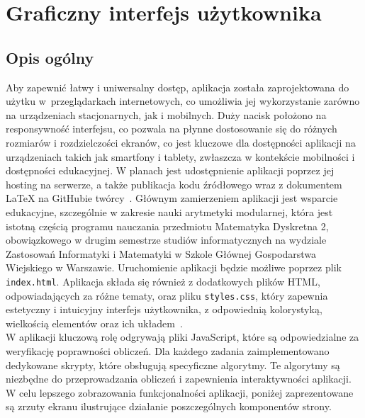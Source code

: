 \documentclass{SGGW-thesis}
\begin{document}
	\chapter{Graficzny interfejs użytkownika}
	\section{Opis ogólny}
	Aby zapewnić łatwy i uniwersalny dostęp, aplikacja została zaprojektowana do użytku w~przeglądarkach internetowych, co umożliwia jej wykorzystanie zarówno na urządzeniach stacjonarnych, jak i mobilnych. Duży nacisk położono na responsywność interfejsu, co pozwala na płynne dostosowanie się do różnych rozmiarów i rozdzielczości ekranów, co jest kluczowe dla dostępności aplikacji na urządzeniach takich jak smartfony i tablety, zwłaszcza w kontekście mobilności i dostępności edukacyjnej. W planach jest udostępnienie aplikacji poprzez jej hosting na serwerze, a także publikacja kodu źródłowego wraz z dokumentem \LaTeX \( \) na GitHubie twórcy~\cite{github}. Głównym zamierzeniem aplikacji jest wsparcie edukacyjne, szczególnie w zakresie nauki arytmetyki modularnej, która jest istotną częścią programu nauczania przedmiotu Matematyka Dyskretna 2, obowiązkowego w drugim semestrze studiów informatycznych na wydziale Zastosowań Informatyki i Matematyki w Szkole Głównej Gospodarstwa Wiejskiego w Warszawie. Uruchomienie aplikacji będzie możliwe poprzez plik \texttt{index.html}. Aplikacja składa się również z dodatkowych plików HTML, odpowiadających za różne tematy, oraz pliku \texttt{styles.css}, który zapewnia estetyczny i intuicyjny interfejs użytkownika, z odpowiednią kolorystyką, wielkością elementów oraz ich układem~\cite{htmlcssksiazka}.
	\\
	W aplikacji kluczową rolę odgrywają pliki JavaScript, które są odpowiedzialne za weryfikację poprawności obliczeń. Dla każdego zadania zaimplementowano dedykowane skrypty, które obsługują specyficzne algorytmy. Te algorytmy są niezbędne do przeprowadzania obliczeń i zapewnienia interaktywności aplikacji. W celu lepszego zobrazowania funkcjonalności aplikacji, poniżej zaprezentowane są zrzuty ekranu ilustrujące działanie poszczególnych komponentów strony.
	\newpage
	
\end{document}
